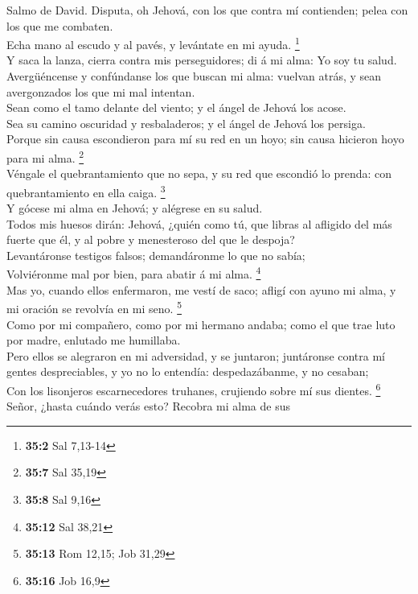  Salmo de David. Disputa, oh Jehová, con los que contra mí
contienden; pelea con los que me combaten.\\
 Echa mano al escudo y al pavés, y levántate en mi ayuda.
\footnote{\textbf{35:2} Sal 7,13-14}\\
 Y saca la lanza, cierra contra mis perseguidores; di á mi
alma: Yo soy tu salud.\\
 Avergüéncense y confúndanse los que buscan mi alma:
vuelvan atrás, y sean avergonzados los que mi mal intentan.\\
 Sean como el tamo delante del viento; y el ángel de
Jehová los acose.\\
 Sea su camino oscuridad y resbaladeros; y el ángel de
Jehová los persiga.\\
 Porque sin causa escondieron para mí su red en un hoyo;
sin causa hicieron hoyo para mi alma. \footnote{\textbf{35:7} Sal 35,19}\\
 Véngale el quebrantamiento que no sepa, y su red que
escondió lo prenda: con quebrantamiento en ella caiga. \footnote{\textbf{35:8}
  Sal 9,16}\\
 Y gócese mi alma en Jehová; y alégrese en su salud.\\
 Todos mis huesos dirán: Jehová, ¿quién como tú, que
libras al afligido del más fuerte que él, y al pobre y menesteroso del
que le despoja?\\
 Levantáronse testigos falsos; demandáronme lo que no
sabía;\\
 Volviéronme mal por bien, para abatir á mi alma.
\footnote{\textbf{35:12} Sal 38,21}\\
 Mas yo, cuando ellos enfermaron, me vestí de saco;
afligí con ayuno mi alma, y mi oración se revolvía en mi seno.
\footnote{\textbf{35:13} Rom 12,15; Job 31,29}\\
 Como por mi compañero, como por mi hermano andaba; como
el que trae luto por madre, enlutado me humillaba.\\
 Pero ellos se alegraron en mi adversidad, y se juntaron;
juntáronse contra mí gentes despreciables, y yo no lo entendía:
despedazábanme, y no cesaban;\\
 Con los lisonjeros escarnecedores truhanes, crujiendo
sobre mí sus dientes. \footnote{\textbf{35:16} Job 16,9}\\
 Señor, ¿hasta cuándo verás esto? Recobra mi alma de sus
